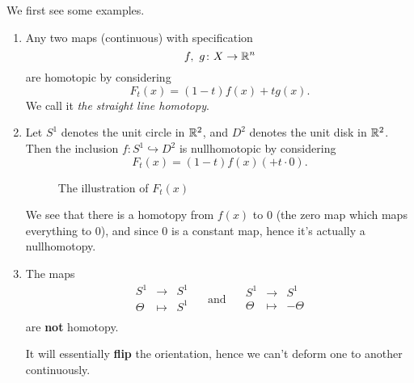 \begin{eg}
	We first see some examples.
	\begin{enumerate}
		\item Any two maps (continuous) with specification
		      \[
			      f,\ g\colon X\to \mathbb{\MakeUppercase{R}} ^n
		      \]
		      are homotopic by considering
		      \[
			      F_{t}(x) = (1 - t)f(x) + t g(x).
		      \]
		      We call it \emph{the straight line homotopy}.
		\item Let \(S^1\) denotes the unit circle in \(\mathbb{\MakeUppercase{R}} ^2\), and
		      \(D^2\)  denotes the unit disk in \(\mathbb{\MakeUppercase{R}} ^2\). Then the inclusion
		      \(f\colon S^1\hookrightarrow D^2\) is nullhomotopic by considering
		      \[
			      F_t(x) = (1 - t)f(x) ( + t\cdot 0).
		      \]
		      \begin{figure}[H]
			      \centering
			      \caption{The illustration of \(F_{t}(x)\)}
			      \label{fig:eg-homotopy}
		      \end{figure}
		      We see that there is a homotopy from \(f(x)\) to \(0\) (the zero map which maps everything to \(0\)), and since \(0\) is a constant map, hence it's actually
		      a nullhomotopy.
		\item The maps
		      \[
			      \begin{array}{ccc}
				      S^1    & \to     & S^1 \\
				      \Theta & \mapsto & S^1 \\
			      \end{array}\quad \text{ and } \quad
			      \begin{array}{ccc}
				      S^1    & \to     & S^1     \\
				      \Theta & \mapsto & -\Theta \\
			      \end{array}
		      \]
		      are \textbf{not} homotopy.
		      \begin{remark}
			      It will essentially \textbf{flip} the orientation, hence we can't deform one to another continuously.
		      \end{remark}
	\end{enumerate}
\end{eg}

